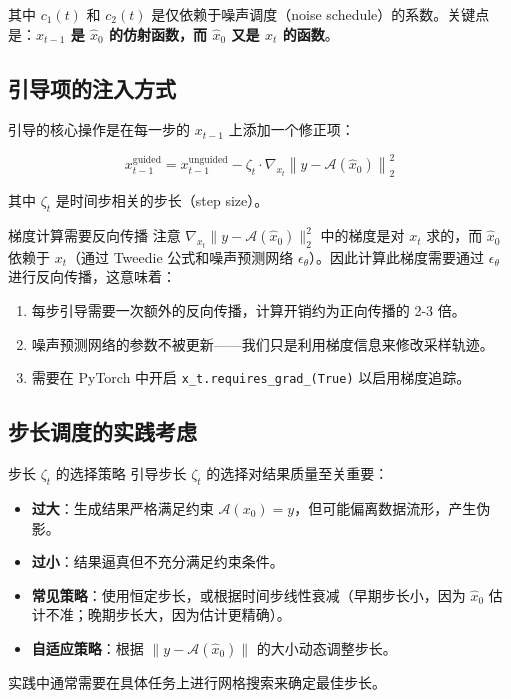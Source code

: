 \documentclass[a4paper]{article}
\begin{document}
其中 $c_1(t)$ 和 $c_2(t)$ 是仅依赖于噪声调度（noise schedule）的系数。关键点是：\textbf{$x_{t-1}$ 是 $\hat{x}_0$ 的仿射函数，而 $\hat{x}_0$ 又是 $x_t$ 的函数}。

\subsection{引导项的注入方式}

引导的核心操作是在每一步的 $x_{t-1}$ 上添加一个修正项：

$$
x_{t-1}^{\text{guided}} = x_{t-1}^{\text{unguided}} - \zeta_t \cdot \nabla_{x_t} \left\| y - \mathcal{A}(\hat{x}_0) \right\|_2^2
$$

其中 $\zeta_t$ 是时间步相关的步长（step size）。

\begin{warningbox}{梯度计算需要反向传播}
注意 $\nabla_{x_t} \| y - \mathcal{A}(\hat{x}_0) \|_2^2$ 中的梯度是对 $x_t$ 求的，而 $\hat{x}_0$ 依赖于 $x_t$（通过 Tweedie 公式和噪声预测网络 $\epsilon_\theta$）。因此计算此梯度需要通过 $\epsilon_\theta$ 进行反向传播，这意味着：
\begin{enumerate}
    \item 每步引导需要一次额外的反向传播，计算开销约为正向传播的 2-3 倍。
    \item 噪声预测网络的参数不被更新——我们只是利用梯度信息来修改采样轨迹。
    \item 需要在 PyTorch 中开启 \texttt{x\_t.requires\_grad\_(True)} 以启用梯度追踪。
\end{enumerate}
\end{warningbox}

\subsection{步长调度的实践考虑}

\begin{knowledgebox}{步长 $\zeta_t$ 的选择策略}
引导步长 $\zeta_t$ 的选择对结果质量至关重要：
\begin{itemize}
    \item \textbf{过大}：生成结果严格满足约束 $\mathcal{A}(x_0) = y$，但可能偏离数据流形，产生伪影。
    \item \textbf{过小}：结果逼真但不充分满足约束条件。
    \item \textbf{常见策略}：使用恒定步长，或根据时间步线性衰减（早期步长小，因为 $\hat{x}_0$ 估计不准；晚期步长大，因为估计更精确）。
    \item \textbf{自适应策略}：根据 $\| y - \mathcal{A}(\hat{x}_0) \|$ 的大小动态调整步长。
\end{itemize}
实践中通常需要在具体任务上进行网格搜索来确定最佳步长。
\end{knowledgebox}
\end{document}
